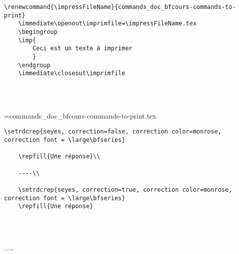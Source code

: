 \begin{tcolorbox}[colback=yellow!10!white, title=Exemple d'utilisation pour \texttt{imp}]
\begin{minipage}{0.45\textwidth}
\begin{lstlisting}[breaklines]
    \renewcommand{\impressFileName}{commands_doc_bfcours-commands-to-print}
    \immediate\openout\imprimfile=\impressFileName.tex
    \begingroup
    \imp{
        Ceci est un texte à imprimer
        }
    \endgroup
    \immediate\closeout\imprimfile

    
\end{lstlisting}
\end{minipage}
\hfill
\begin{minipage}{0.45\textwidth}
    \phantom{a}\\
    \renewcommand{\impressFileName}{commands_doc_bfcours-commands-to-print}
    \immediate\openout\imprimfile=\impressFileName.tex
    \begingroup
    \endgroup
    \immediate\closeout\imprimfile

    
\end{minipage}
\end{tcolorbox}



\begin{tcolorbox}[colback=yellow!10!white, title=Exemple d'utilisation pour \texttt{repfill}]
\begin{minipage}{0.45\textwidth}
\begin{lstlisting}[breaklines]
    \setrdcrep{seyes, correction=false, correction color=monrose, correction font = \large\bfseries}

    \repfill{Une réponse}\\

    ----\\

    \setrdcrep{seyes, correction=true, correction color=monrose, correction font = \large\bfseries}
    \repfill{Une réponse}

\end{lstlisting}
\end{minipage}
\hfill
\begin{minipage}{0.45\textwidth}
\phantom{a}\\

    \\

    ----\\

\end{minipage}
\end{tcolorbox}


